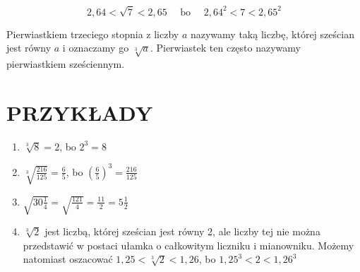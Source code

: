 \documentclass[10pt]{article}
\begin{document}
\[
2,64<\sqrt{7}<2,65 \quad \text { bo } \quad 2,64^{2}<7<2,65^{2}
\]

Pierwiastkiem trzeciego stopnia z liczby \(a\) nazywamy taką liczbę, której sześcian jest równy \(a\) i oznaczamy go \(\sqrt[3]{a}\). Pierwiastek ten często nazywamy pierwiastkiem sześciennym.

\section*{PRZYKŁADY}
\begin{enumerate}
  \item \(\sqrt[3]{8}=2\), bo \(2^{3}=8\)
  \item \(\sqrt[3]{\frac{216}{125}}=\frac{6}{5}\), bo \(\left(\frac{6}{5}\right)^{3}=\frac{216}{125}\)
  \item \(\sqrt{30 \frac{1}{4}}=\sqrt{\frac{121}{4}}=\frac{11}{2}=5 \frac{1}{2}\)
  \item \(\sqrt[3]{2}\) jest liczbą, której sześcian jest równy 2, ale liczby tej nie można przedstawić w postaci ułamka o całkowitym liczniku i mianowniku. Możemy natomiast oszacować \(1,25<\sqrt[3]{2}<1,26\), bo \(1,25^{3}<2<1,26^{3}\)
\end{enumerate}
\end{document}
